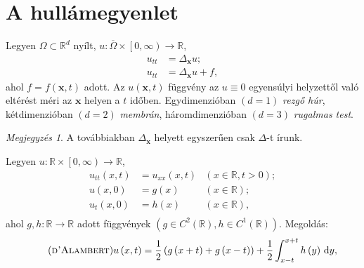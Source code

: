 \documentclass[DIV=15,appendixprefix]{scrreprt}
\theoremstyle{definition}
\theoremstyle{remark}
\newtheorem*{megj}{Megjegyzés}
\begin{document}
\section{A hullámegyenlet}
%
Legyen $ \Omega \subset \mathbb{ R }^{ d } $ nyílt, $ u \colon \overline{ \Omega } \times
\left.\left[ 0,{} \infty \right)\right.\rightarrow \mathbb{ R } $,
\begin{align}
	u_{ tt } 	&= \Delta_{ \mathbf{ x } } u;\tag{homogén}\\
	u_{ tt } 	&= \Delta_{ \mathbf{ x } } u + f,\tag{inhomogén}
\end{align}
ahol $ f = f \left( \mathbf{ x },{} t \right) $ adott. Az $ u \left( \mathbf{ x },{} t \right) $
függvény az $ u \equiv 0 $ egyensúlyi helyzettől való eltérést méri az $ \mathbf{ x } $ helyen a
$ t $ időben. Egydimenzióban $ \left( d = 1 \right) $ \emph{rezgő húr}, kétdimenzióban
$ \left( d = 2 \right) $ \emph{membrán}, háromdimenzióban $ \left( d = 3 \right) $ \emph{rugalmas
test}.
\begin{megj}
	A továbbiakban $ \Delta_{ \mathbf{ x } } $ helyett egyszerűen csak $ \Delta $-t írunk.
\end{megj}
%
Legyen $ u \colon \mathbb{ R } \times \left.\left[ 0,{} \infty \right)\right.\rightarrow
\mathbb{ R } $,
\begin{equation*}
	\begin{aligned}
		u_{ tt } \left(x,{} t \right) 	&= u_{ xx } \left( x,{} t \right) 	&
			\left( x \in \mathbb{ R },{} t > 0 \right);\\
		u \left( x,{} 0 \right) 		&= g \left( x \right) 				& \left( x \in
			\mathbb{ R } \right);\\
		u_{ t } \left( x,{} 0 \right) 	&= h \left( x \right) 				& \left( x \in
			\mathbb{ R } \right),\\
	\end{aligned}
\end{equation*}
ahol $ g,{} h \colon \mathbb{ R } \rightarrow \mathbb{ R } $ adott függvények $ \left( g\in C^{ 2 }
\left( \mathbb{ R } \right),{} h \in C^{ 1 } \left( \mathbb{ R } \right) \right) $. Megoldás:
\begin{equation}\tag{\textsc{d'Alambert}}\label{eq:pde-hullam-dalamb}
	u \left( x,{} t \right) = \frac{ 1 }{ 2 } \left( g \left( x + t \right) + g \left( x - t \right)
	\right) + \frac{ 1 }{ 2 } \int_{ x - t }^{ x + t } h \left( y \right) \, \mathrm{ d } y,
\end{equation}
\end{document}
